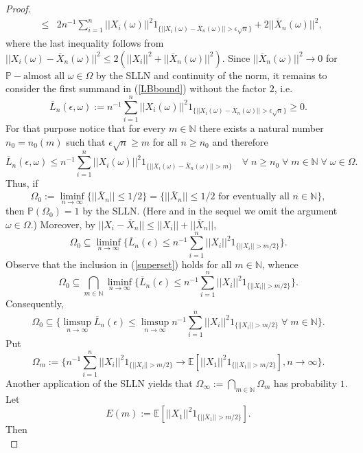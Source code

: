 \documentclass[sn-mathphys,Numbered]{sn-jnl}%
\theoremstyle{thmstyleone}%
\theoremstyle{thmstyletwo}%
\theoremstyle{thmstylethree}%
\begin{document}
\begin{proof}
\begin{eqnarray}
&\le& 2 n^{-1} \sum_{i=1}^n ||X_i(\omega)||^2 1_{\{||X_i(\omega)-\overline{X}_n(\omega)||> \epsilon \sqrt{n}\}}+2 ||\overline{X}_n(\omega)||^2, \label{LBbound}
\end{eqnarray}
where the last inequality follows from $||X_i(\omega)-\overline{X}_n(\omega)||^2 \le 2 (||X_i||^2+||\overline{X}_n(\omega)||^2)$. Since
$||\overline{X}_n(\omega)||^2 \rightarrow 0$ for $\mathbb{P}-\text{almost all } \omega \in \Omega$ by the SLLN and continuity of the norm, it remains to consider the first summand in (\ref{LBbound}) without the factor $2$, i.e.
$$
 \overline{L}_n(\epsilon,\omega):=n^{-1} \sum_{i=1}^n ||X_i(\omega)||^2 1_{\{||X_i(\omega)-\overline{X}_n(\omega)||> \epsilon \sqrt{n}\}} \ge 0.
$$
For that purpose notice that for every $m \in \mathbb{N}$ there exists a natural number $n_0=n_0(m)$ such that $\epsilon \sqrt{n} \ge m$ for all
$n \ge n_0$ and therefore
$$
 \overline{L}_n(\epsilon,\omega) \le n^{-1} \sum_{i=1}^n ||X_i(\omega)||^2 1_{\{||X_i(\omega)-\overline{X}_n(\omega)||> m\}} \quad \forall \; n \ge n_0 \; \forall\; m \in \mathbb{N} \; \forall \; \omega \in \Omega.
$$
Thus, if
$$
\Omega_0:= \liminf_{n \rightarrow \infty} \{||\overline{X}_n|| \le 1/2\}= \{||\overline{X}_n|| \le 1/2 \text{ for eventually all } n \in \mathbb{N}\},
$$
then $\mathbb{P}(\Omega_0)=1$ by the SLLN. (Here and in the sequel we omit the argument $\omega \in \Omega$.) Moreover, by $||X_i-\overline{X}_n||\le ||X_i||+ ||\overline{X}_n||$,
\begin{equation} \label{superset}
 \Omega_0 \subseteq \liminf_{n \rightarrow \infty} \{\overline{L}_n(\epsilon) \le n^{-1} \sum_{i=1}^n ||X_i||^2 1_{\{||X_i||> m/2\}}\}.
\end{equation}
Observe that the inclusion in (\ref{superset}) holds for all $m \in \mathbb{N}$, whence
$$
 \Omega_0 \subseteq \bigcap _{m \in \mathbb{N}} \liminf_{n \rightarrow \infty} \{\overline{L}_n(\epsilon) \le n^{-1} \sum_{i=1}^n ||X_i||^2 1_{\{||X_i||> m/2\}}\}.
$$
Consequently,
$$
 \Omega_0 \subseteq \{\limsup_{n \rightarrow \infty}\overline{L}_n(\epsilon) \le \limsup_{n \rightarrow \infty}n^{-1} \sum_{i=1}^n ||X_i||^2 1_{\{||X_i||> m/2\}} \; \forall \; m \in \mathbb{N}\}.
$$
Put
$$
  \Omega_m:=\{n^{-1} \sum_{i=1}^n ||X_i||^2 1_{\{||X_i||> m/2\}} \rightarrow \mathbb{E}[||X_1||^2 1_{\{||X_1||> m/2\}}], n \rightarrow \infty\}.
$$
Another application of the SLLN yields that $\Omega_\infty := \bigcap_{m \in \mathbb{N}} \Omega_m$ has probability $1$.
Let
$$
  E(m):= \mathbb{E}[||X_1||^2 1_{\{||X_1||> m/2\}}].
$$
Then
\begin{equation} \label{superset2}

\end{equation}
\end{proof}
\end{document}
